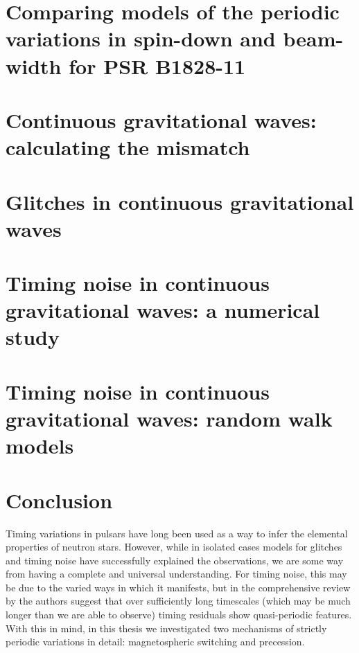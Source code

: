 \documentclass[twoside, 11pt]{thesis}
\begin{document}
\chapter{Comparing models of the periodic variations in spin-down
and beam-width for PSR B1828-11}
\label{sec: testing models}


\chapter{Continuous gravitational waves: calculating the mismatch}
\label{sec: intro to cgw}


\chapter{Glitches in continuous gravitational waves}
\label{sec: glitches in cgw}


\chapter{Timing noise in continuous gravitational waves: a numerical study}
\label{sec: timing noise in cgw}


\chapter{Timing noise in continuous gravitational waves: random walk models}
\label{sec: timing noise in cgw analytic}


\chapter{Conclusion}
\label{sec: final conclusion}

Timing variations in pulsars have long been used as a way to infer the
elemental properties of neutron stars. However, while in isolated cases models
for glitches and timing noise have successfully explained the observations, we
are some way from having a complete and universal understanding. For timing
noise, this may be due to the varied ways in which it manifests, but in the
comprehensive review by \citet{Hobbs2010} the authors suggest that over
sufficiently long timescales (which may be much longer than we are able to
observe) timing residuals show quasi-periodic features. With this in mind, in
this thesis we investigated two mechanisms of strictly periodic variations in
detail: magnetospheric switching and precession.
\end{document}
